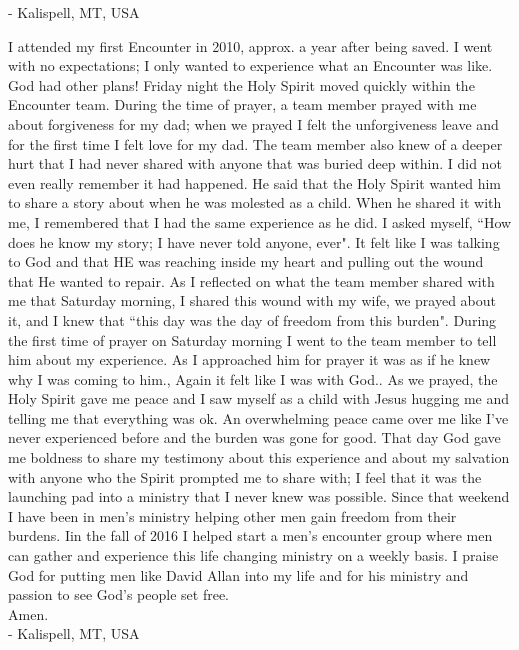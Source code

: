 \documentclass[oneside]{book}
\begin{document}
- Kalispell, MT, USA
\clearpage

I attended my first Encounter in 2010, approx. a year after being saved. I went with no expectations; I only wanted to experience what an Encounter was like. God had other plans!
Friday night the Holy Spirit moved quickly within the Encounter team. During the time of prayer, a team member prayed with me about forgiveness for my dad; when we prayed I felt the unforgiveness leave and for the first time I felt love for my dad. The team member also knew of a deeper hurt that I had never shared with anyone that was buried deep within. I did not even really remember it had happened. He said that the Holy Spirit wanted him to share a story about when he was molested as a child. When he shared it with me, I remembered that I had the same experience as he did. I asked myself, ``How does he know my story; I have never told anyone, ever". It felt like I was talking to God and that HE was reaching inside my heart and pulling out the wound that He wanted to repair.
As I reflected on what the team member shared with me that Saturday morning, I shared this wound with my wife, we prayed about it, and I knew that ``this day was the day of freedom from this burden".
During the first time of prayer on Saturday morning I went to the team member to tell him about my experience. As I approached him for prayer it was as if he knew why I was coming to him., Again it felt like I was with God.. As we prayed, the Holy Spirit gave me peace and I saw myself as a child with Jesus hugging me and telling me that everything was ok. An overwhelming peace came over me like I've never experienced before and the burden was gone for good.
That day God gave me boldness to share my testimony about this experience and about my salvation with anyone who the Spirit prompted me to share with; I feel that it was the launching pad into a ministry that I never knew was possible.
Since that weekend I have been in men's ministry helping other men gain freedom from their burdens. Iin the fall of 2016 I helped start a men's encounter group where men can gather and experience this life changing ministry on a weekly basis.
I praise God for putting men like David Allan into my life and for his ministry and passion to see God's people set free.\\

Amen. \\

- Kalispell, MT, USA
\clearpage
\end{document}
